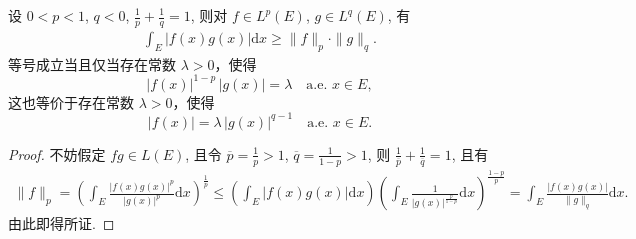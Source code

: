 \documentclass[../../main.tex]{subfiles}%
\begin{document}
\begin{theorem}\label{theorem:反向Hölder不等式}
设 $0<p<1$, $q<0$, $\frac{1}{p}+\frac{1}{q}=1$, 则对 $f\in L^p(E)$, $g\in L^q(E)$, 有
\begin{align*}
\int_E |f(x)g(x)|\mathrm{d}x \geqslant \|f\|_p \cdot \|g\|_q.
\end{align*}
等号成立当且仅当存在常数 $\lambda>0$，使得
\[
|f(x)|^{1-p}\,|g(x)| = \lambda \quad \text{a.e. } x\in E,
\]
这也等价于存在常数 $\lambda>0$，使得
\[
|f(x)| = \lambda \, |g(x)|^{q-1} \quad \text{a.e. } x\in E.
\]
\end{theorem}
\begin{proof}
不妨假定 $fg\in L(E)$, 且令 $\overline{p}=\frac{1}{p}>1$, $\overline{q}=\frac{1}{1-p}>1$, 则 $\frac{1}{\overline{p}}+\frac{1}{\overline{q}}=1$, 且有
\begin{align*}
\|f\|_p = \left( \int_E \frac{|f(x)g(x)|^p}{|g(x)|^p} \mathrm{d}x \right)^{\frac{1}{p}} 
\leqslant \left( \int_E |f(x)g(x)|\mathrm{d}x \right) \left( \int_E \frac{1}{|g(x)|^{\frac{p}{1-p}}} \mathrm{d}x \right)^{\frac{1-p}{p}} 
= \int_E \frac{|f(x)g(x)|}{\|g\|_q} \mathrm{d}x.
\end{align*}
由此即得所证.
\end{proof}
\end{document}
